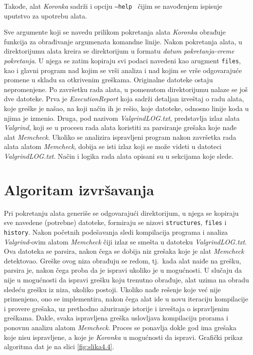 \documentclass[12pt,oneside]{memoir}
\theoremstyle{plain}
\theoremstyle{definition}
\begin{document}
Takođe, alat \textit{Koronka} sadrži i opciju \texttt{--help } čijim se navođenjem ispisuje uputstvo za upotrebu alata. 

Sve argumente koji se navedu prilikom pokretanja alata \textit{Koronka} obrađuje funkcija za obrađivanje argumenata komandne linije. Nakon pokretanja alata, u direktorijumu alata kreira se direktorijum u formatu \textit{datum pokretanja-vreme pokretanja}. U njega se zatim kopiraju svi podaci navedeni kao arugment \texttt{files}, kao i glavni program nad kojim se vrši analiza i nad kojim se vrše odgovarajuće promene u skladu sa otkrivenim greškama. Originalne datoteke ostaju nepromenjene. Po završetku rada alata, u pomenutom direktorijumu nalaze se još dve datoteke. Prva je \textit{ExecutionReport} koja sadrži detaljan izveštaj o radu alata, koje greške je našao, na koji način ih je rešio, koje datoteke, odnosno linije koda u njima je izmenio. Druga, pod nazivom \textit{ValgrindLOG.txt}, predstavlja izlaz alata \textit{Valgrind}, koji se u procesu rada alata koristiti za parsiranje grešaka koje nađe alat \textit{Memcheck}. Ukoliko se analizira ispravljeni program nakon završetka rada alata alatom \textit{Memcheck}, dobija se isti izlaz koji se može videti u datoteci \textit{ValgrindLOG.txt}. Način i logika rada alata opisani su u sekcijama koje slede.

\section{Algoritam izvršavanja}\label{algoritam}
Pri pokretanju alata generiše se odgovarajući direktorijum, u njega se kopiraju sve navedene (potrebne) datoteke, formiraju se nizovi \texttt{structures}, \texttt{files} i \texttt{history}. Nakon početnih podešavanja sledi kompilacija programa i analiza \textit{Valgrind}-ovim alatom \textit{Memcheck} čiji izlaz se smešta u datoteku \textit{ValgrindLOG.txt}. Ova datoteka se parsira, nakon čega se dobija niz grešaka koje je alat \textit{Memcheck} detektovao. Greške ovog niza obrađuju se redom, tj.~kada alat naiđe na grešku, parsira je, nakon čega proba da je ispravi ukoliko je u mogućnosti. U slučaju da nije u mogućnosti da ispravi grešku koju trenutno obrađuje, alat uzima na obradu sledeću grešku iz niza, ukoliko postoji. Ukoliko nađe rešenje koje već nije primenjeno, ono se implementira, nakon čega alat ide u novu iteraciju kompilacije i provere grešaka, uz prethodno ažuriranje istorije i izveštaja o ispravljenim greškama. Dakle, svaka ispravljena greška uslovljava kompilaciju prorama i ponovnu analizu alatom \textit{Memcheck}. Proces se ponavlja dokle god ima grešaka koje nisu ispravljene, a koje je \textit{Koronka} u mogućnosti da ispravi. Grafički prikaz algoritma dat je na slici \ref{fig:slika4.4}.
\end{document}
